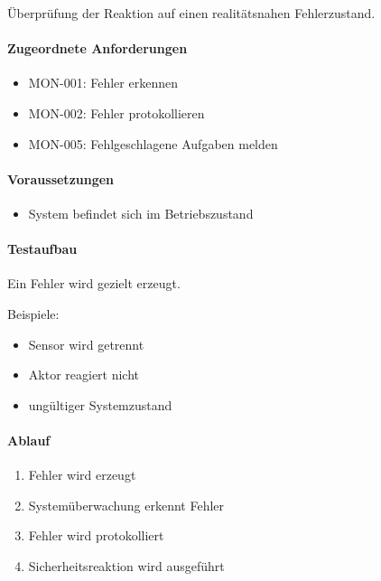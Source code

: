 Überprüfung der Reaktion auf einen realitätsnahen Fehlerzustand.

\paragraph{Zugeordnete
Anforderungen}\label{zugeordnete-anforderungen-31}

\begin{itemize}
\tightlist
\item
  MON-001: Fehler erkennen
\item
  MON-002: Fehler protokollieren
\item
  MON-005: Fehlgeschlagene Aufgaben melden
\end{itemize}

\paragraph{Voraussetzungen}\label{voraussetzungen-30}

\begin{itemize}
\tightlist
\item
  System befindet sich im Betriebszustand
\end{itemize}

\paragraph{Testaufbau}\label{testaufbau-7}

Ein Fehler wird gezielt erzeugt.

Beispiele:

\begin{itemize}
\tightlist
\item
  Sensor wird getrennt
\item
  Aktor reagiert nicht
\item
  ungültiger Systemzustand
\end{itemize}

\paragraph{Ablauf}\label{ablauf-31}

\begin{enumerate}
\def\labelenumi{\arabic{enumi}.}
\tightlist
\item
  Fehler wird erzeugt
\item
  Systemüberwachung erkennt Fehler
\item
  Fehler wird protokolliert
\item
  Sicherheitsreaktion wird ausgeführt
\end{enumerate}

